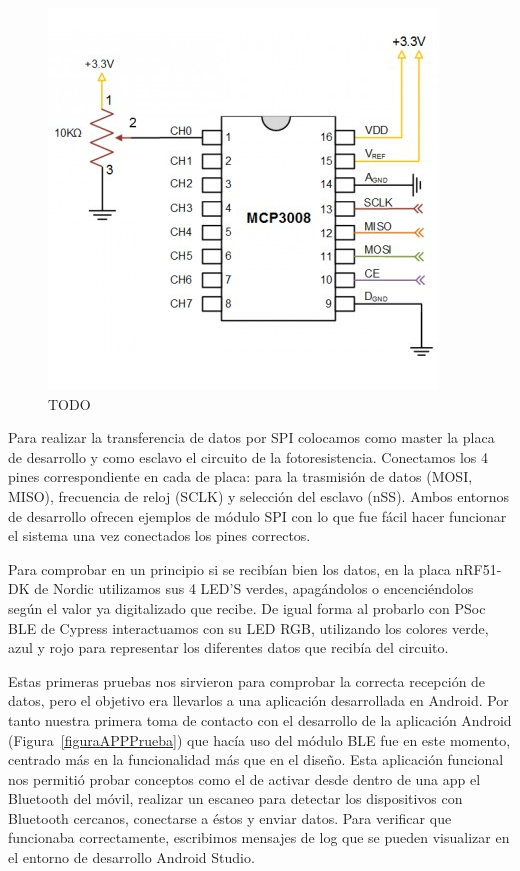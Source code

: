 \begin{figure}[h]%
	\centering
    \includegraphics{figures/mcp3008_esquema.PNG} %
    \caption[TODO]{TODO}
   	\label{figuraMCPEsquema}
\end{figure}

Para realizar la transferencia de datos por SPI colocamos como master la placa de desarrollo y como esclavo el circuito de la fotoresistencia. Conectamos los 4 pines correspondiente en cada de placa: para la trasmisión de datos (MOSI, MISO), frecuencia de reloj (SCLK) y selección del esclavo (nSS). Ambos entornos de desarrollo ofrecen ejemplos de módulo SPI con lo que fue fácil hacer funcionar el sistema una vez conectados los pines correctos.

Para comprobar en un principio si se recibían bien los datos, en la placa nRF51-DK de Nordic utilizamos sus 4 LED’S verdes, apagándolos o encenciéndolos según el valor ya digitalizado que recibe. De igual forma al probarlo con PSoc BLE de Cypress interactuamos con su LED RGB, utilizando los colores verde, azul y rojo para representar los diferentes datos que recibía del circuito.

Estas primeras pruebas nos sirvieron para comprobar la correcta recepción de datos, pero el objetivo era llevarlos a una aplicación desarrollada en Android. Por tanto nuestra primera toma de contacto con el desarrollo de la aplicación Android (Figura~\ref{figuraAPPPrueba}) que hacía uso del módulo BLE fue en este momento, centrado más en la funcionalidad más que en el diseño. Esta aplicación funcional nos permitió probar conceptos como el de activar desde dentro de una app el Bluetooth del móvil, realizar un escaneo para detectar los dispositivos con Bluetooth cercanos, conectarse a éstos y enviar datos. Para verificar que funcionaba correctamente, escribimos mensajes de log  que se pueden visualizar en el entorno de desarrollo Android Studio.

